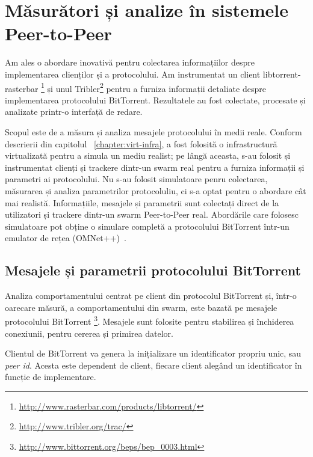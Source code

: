 
\chapter{Măsurători și analize în sistemele Peer-to-Peer}
\label{chapter:proto-measure}

Am ales o abordare inovativă pentru colectarea informațiilor despre
implementarea clienților și a protocolului. Am instrumentat un client
libtorrent-rasterbar
\footnote{\url{http://www.rasterbar.com/products/libtorrent/}}
și unul Tribler\footnote{\url{http://www.tribler.org/trac/}}
pentru a furniza informații detaliate despre implementarea protocolului
BitTorrent. Rezultatele au fost colectate, procesate și analizate printr-o
interfață de redare.

Scopul este de a măsura și analiza mesajele protocolului în medii reale.
Conform descrierii din capitolul ~\ref{chapter:virt-infra}, a fost folosită o
infrastructură virtualizată pentru a simula un mediu realist; pe lângă aceasta,
s-au folosit și instrumentat clienți și trackere dintr-un swarm real pentru a
furniza informații și parametri ai protocolului. Nu s-au folosit simulatoare
penru colectarea, măsurarea și analiza parametrilor protocoluliu, ci s-a
optat pentru o abordare cât mai realistă. Informațiile, mesajele și parametrii
sunt colectați direct de la utilizatori și trackere dintr-un swarm
Peer-to-Peer real. Abordările care folosesc simulatoare pot obține o
simulare completă a protocolului BitTorrent într-un emulator de rețea
(OMNet++)~\cite{simulating-bittorrent}.

\section{Mesajele și parametrii protocolului BitTorrent}
\label{sec:proto-measure:protocol-messages}

Analiza comportamentului centrat pe client din protocolul BitTorrent și,
într-o oarecare măsură, a comportamentului din swarm, este bazată pe mesajele
protocolului BitTorrent
\footnote{\url{http://www.bittorrent.org/beps/bep\_0003.html}}.
Mesajele sunt folosite pentru stabilirea și închiderea conexiunii, pentru
cererea și primirea datelor.

Clientul de BitTorrent va genera la inițializare un identificator propriu unic,
sau \textit{peer id}. Acesta este dependent de client, fiecare client alegând
un identificator în funcție de implementare.

